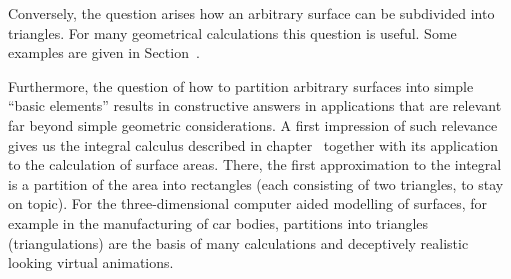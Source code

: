 \begin{MIntro}
Conversely, the question arises how an arbitrary surface can be subdivided into triangles. 
For many geometrical calculations this question is useful. 
Some examples are given in Section~.

Furthermore, the question of how to partition arbitrary surfaces into simple 
``basic elements'' results in constructive answers in applications that are relevant 
far beyond simple geometric considerations. A first impression of such relevance gives 
us the integral calculus described in chapter~ together with its application 
to the calculation of surface areas. There, the first approximation to the integral is 
a partition of the area into rectangles (each consisting of two triangles, to stay on  topic). For the three-dimensional computer aided modelling of surfaces,
for example in the manufacturing of car bodies, partitions into triangles 
(triangulations) are the basis of many calculations and deceptively realistic 
looking virtual animations. 
\end{MIntro}


